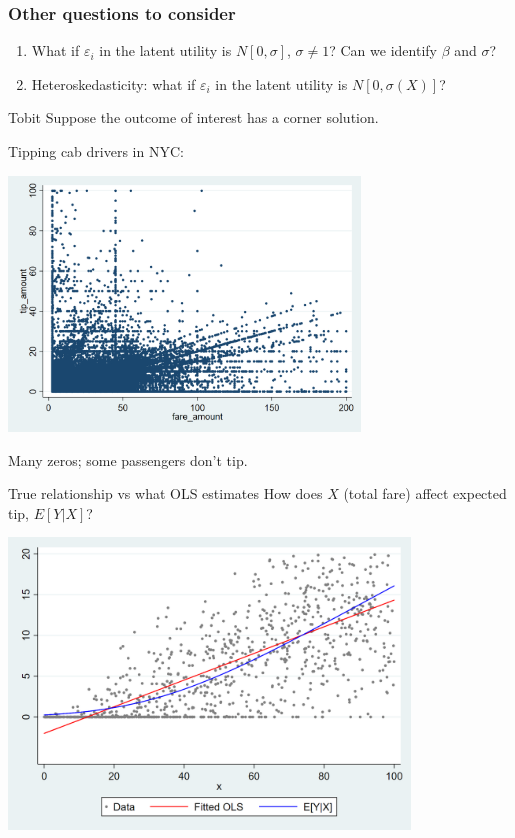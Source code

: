 \documentclass[pdftex]{beamer}
\begin{document}
\begin{frame}
\frametitle{Other questions to consider}
\begin{enumerate}
	\item{What if $\varepsilon_i$ in the latent utility is $N[0,\sigma]$, $\sigma\neq{1}$? Can we identify $\beta$ and $\sigma$?}
	\item{Heteroskedasticity: what if $\varepsilon_i$ in the latent utility is $N[0,\sigma(X)]$?}
\end{enumerate}

\end{frame}

\begin{frame}{Tobit}
Suppose the outcome of interest has a corner solution.\\\smallskip

Tipping cab drivers in NYC:
\begin{center}
	\includegraphics[width=0.7\textwidth]{graphs/cab_fares.png}
\end{center}
Many zeros; some passengers don't tip.
\end{frame}

\begin{frame}{True relationship vs what OLS estimates}
How does $X$ (total fare) affect expected tip, $E[Y|X]$?
\begin{center}
\includegraphics[width=0.8\textwidth]{graphs/ols_vs_tobit.png}
\end{center}

\end{frame}
\end{document}
